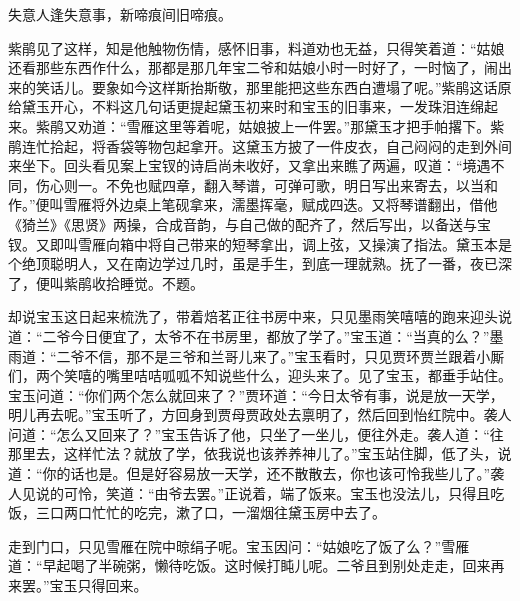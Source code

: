 \begin{poem}
    \begin{pl}
        失意人逢失意事，新啼痕间旧啼痕。
    \end{pl}
\end{poem}


\begin{parag}
    紫鹃见了这样，知是他触物伤情，感怀旧事，料道劝也无益，只得笑着道：“姑娘还看那些东西作什么，那都是那几年宝二爷和姑娘小时一时好了，一时恼了，闹出来的笑话儿。要象如今这样斯抬斯敬，那里能把这些东西白遭塌了呢。”紫鹃这话原给黛玉开心，不料这几句话更提起黛玉初来时和宝玉的旧事来，一发珠泪连绵起来。紫鹃又劝道：“雪雁这里等着呢，姑娘披上一件罢。”那黛玉才把手帕撂下。紫鹃连忙拾起，将香袋等物包起拿开。这黛玉方披了一件皮衣，自己闷闷的走到外间来坐下。回头看见案上宝钗的诗启尚未收好，又拿出来瞧了两遍，叹道：“境遇不同，伤心则一。不免也赋四章，翻入琴谱，可弹可歌，明日写出来寄去，以当和作。”便叫雪雁将外边桌上笔砚拿来，濡墨挥毫，赋成四迭。又将琴谱翻出，借他《猗兰》《思贤》两操，合成音韵，与自己做的配齐了，然后写出，以备送与宝钗。又即叫雪雁向箱中将自己带来的短琴拿出，调上弦，又操演了指法。黛玉本是个绝顶聪明人，又在南边学过几时，虽是手生，到底一理就熟。抚了一番，夜已深了，便叫紫鹃收拾睡觉。不题。
\end{parag}


\begin{parag}
    却说宝玉这日起来梳洗了，带着焙茗正往书房中来，只见墨雨笑嘻嘻的跑来迎头说道：“二爷今日便宜了，太爷不在书房里，都放了学了。”宝玉道：“当真的么？”墨雨道：“二爷不信，那不是三爷和兰哥儿来了。”宝玉看时，只见贾环贾兰跟着小厮们，两个笑嘻的嘴里咭咭呱呱不知说些什么，迎头来了。见了宝玉，都垂手站住。宝玉问道：“你们两个怎么就回来了？”贾环道：“今日太爷有事，说是放一天学，明儿再去呢。”宝玉听了，方回身到贾母贾政处去禀明了，然后回到怡红院中。袭人问道：“怎么又回来了？”宝玉告诉了他，只坐了一坐儿，便往外走。袭人道：“往那里去，这样忙法？就放了学，依我说也该养养神儿了。”宝玉站住脚，低了头，说道：“你的话也是。但是好容易放一天学，还不散散去，你也该可怜我些儿了。”袭人见说的可怜，笑道：“由爷去罢。”正说着，端了饭来。宝玉也没法儿，只得且吃饭，三口两口忙忙的吃完，漱了口，一溜烟往黛玉房中去了。
\end{parag}


\begin{parag}
    走到门口，只见雪雁在院中晾绢子呢。宝玉因问：“姑娘吃了饭了么？”雪雁道：“早起喝了半碗粥，懒待吃饭。这时候打盹儿呢。二爷且到别处走走，回来再来罢。”宝玉只得回来。
\end{parag}


